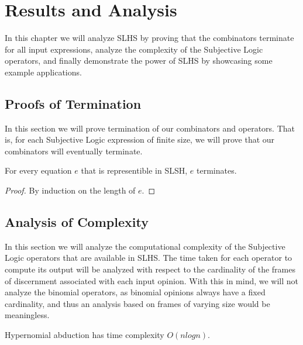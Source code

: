 \documentclass[thesis.tex]{subfiles}
\begin{document}
\chapter{Results and Analysis}
\label{chap:results-and-analysis}

In this chapter we will analyze SLHS by proving that the combinators terminate for
all input expressions, analyze the complexity of the Subjective Logic operators, and
finally demonstrate the power of SLHS by showcasing some example applications.





\section{Proofs of Termination}

In this section we will prove termination of our combinators and operators. That is,
for each Subjective Logic expression of finite size, we will prove that our combinators
will eventually terminate.




\begin{theorem}
  For every equation $e$ that is representible in SLSH, $e$ terminates.
\end{theorem}

\begin{proof}
  By induction on the length of $e$.
\end{proof}






\section{Analysis of Complexity}

In this section we will analyze the computational complexity of the Subjective Logic
operators that are available in SLHS. The time taken for each operator to compute its
output will be analyzed with respect to the cardinality of the frames of discernment
associated with each input opinion. With this in mind, we will not analyze the
binomial operators, as binomial opinions always have a fixed cardinality, and thus
an analysis based on frames of varying size would be meaningless.





\begin{theorem}
  Hypernomial abduction has time complexity $O (n log n)$.
\end{theorem}
\end{document}
